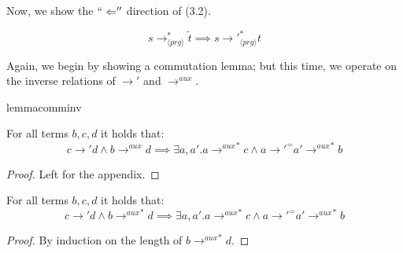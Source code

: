 Now, we show the $`` \Leftarrow ''$ direction of (3.2).

\begin{lemma}
\label{lem:prop2rl}
\[
s \longrightarrow^*_{\langle prg \rangle} \widetilde{t} \implies s {\longrightarrow'}_{\langle prg \rangle}^* t
\]
\end{lemma}

Again, we begin by showing a commutation lemma; but this time, we operate on the inverse relations of $\longrightarrow'$ and $\longrightarrow^{aux}$.

\begin{restatable}{lemma}{comminv}
\label{lem:comminv}

For all terms $b,c,d$ it holds that:
\[
c {\longrightarrow'} d \land b \longrightarrow^{aux} d \implies \exists a, a' . a {\longrightarrow^{aux}}^* c \land a {\longrightarrow'}^= a' {\longrightarrow^{aux}}^*  b
\]

\end{restatable}
\begin{proof}
Left for the appendix.
\end{proof}

\begin{corollary}
\label{cor:comminvcor}

For all terms $b,c,d$ it holds that:
\[
c \longrightarrow' d \land b {\longrightarrow^{aux}}^* d \implies \exists a, a' . a {\longrightarrow^{aux}}^* c \land a {\longrightarrow'}^= a' {\longrightarrow^{aux}}^* b
\]

\begin{proof}

By induction on the length of $b {\longrightarrow^{aux}}^* d$.

\end{proof}
\end{corollary}

